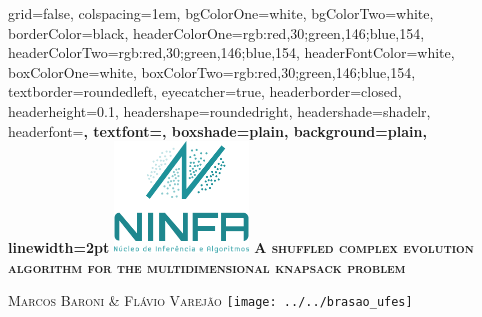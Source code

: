 \documentclass[portrait,final,a0paper,fontscale=0.277]{baposter}
\begin{document}
\begin{poster}%
  {
  grid=false,
  colspacing=1em,
  bgColorOne=white,
  bgColorTwo=white,
  borderColor=black,
  headerColorOne={rgb:red,30;green,146;blue,154},
  headerColorTwo={rgb:red,30;green,146;blue,154},
  headerFontColor=white,
  boxColorOne=white,
  boxColorTwo={rgb:red,30;green,146;blue,154},
  textborder=roundedleft,
  eyecatcher=true,
  headerborder=closed,
  headerheight=0.1\textheight,
  headershape=roundedright,
  headershade=shadelr,
  headerfont=\Large\bf\textsc, %
  textfont={\setlength{\parindent}{1.5em}},
  boxshade=plain,
  background=plain,
  linewidth=2pt
  }
  {\includegraphics[height=8em]{imgs/ninfa_logo.png}} 
  {\bf\textsc{A shuffled complex evolution algorithm for
the multidimensional knapsack problem}\vspace{0.5em}}
  {\textsc{Marcos Baroni & Flávio Varejão}
  {%
    \texttt{[image: ../../brasao\_ufes]}
  }

    \newcommand{\colouredcircle}{%
      \tikz{\useasboundingbox (-0.2em,-0.32em) rectangle(0.2em,0.32em); \draw[draw=black,fill=lightblue,line width=0.03em] (0,0) circle(0.18em);}}

}
\end{poster}
\end{document}

